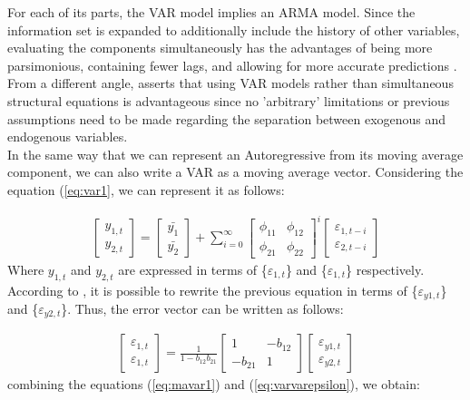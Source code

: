 For each of its parts, the VAR model implies an ARMA model. Since the information set is expanded to additionally include the history of other variables, evaluating the components simultaneously has the advantages of being more parsimonious, containing fewer lags, and allowing for more accurate predictions \cite[p.322]{verbeek2008guide}. From a different angle, \cite{sims1980macroeconomics} asserts that using VAR models rather than simultaneous structural equations is advantageous since no 'arbitrary' limitations or previous assumptions need to be made regarding the separation between exogenous and endogenous variables.\\

In the same way that we can represent an Autoregressive from its moving average component, we can also write a VAR as a moving average vector. Considering the equation (\ref{eq:var1}, we can represent it as follows:

\begin{align} \label{eq:mavar1}
    \begin{bmatrix}
    y_{1,t} \\
    y_{2,t}
    \end{bmatrix} = 
    \begin{bmatrix}
    \bar{y_1}\\
    \bar{y_2}
    \end{bmatrix} + \sum_{i=0}^{\infty}
    \begin{bmatrix}
    \phi_{11} & \phi_{12} \\
    \phi_{21} & \phi_{22}
    \end{bmatrix}^i
    \begin{bmatrix}
    \varepsilon_{1,t-i} \\
    \varepsilon_{2,t-i}
    \end{bmatrix} 
\end{align}
Where $y_{1, t}$ and $y_{2, t}$ are expressed in terms of \{$\varepsilon_{1, t}$\} and \{$\varepsilon_{1, t}$\} respectively. According to \cite{enders2008applied}, it is possible to rewrite the previous equation in terms of \{$\varepsilon_{y1, t}$\} and \{$\varepsilon_{y2, t}$\}. Thus, the error vector can be written as follows:

\begin{align} \label{eq:varvarepsilon}
    \begin{bmatrix}
    \varepsilon_{1,t} \\
    \varepsilon_{1,t}
    \end{bmatrix} = \frac{1}{1 - b_{12}b_{21}}
    \begin{bmatrix}
    1 & -b_{12} \\
    -b_{21} & 1
    \end{bmatrix}
    \begin{bmatrix}
    \varepsilon_{y1, t} \\
    \varepsilon_{y2, t}
    \end{bmatrix}
\end{align}
combining the equations (\ref{eq:mavar1}) and (\ref{eq:varvarepsilon}), we obtain:

